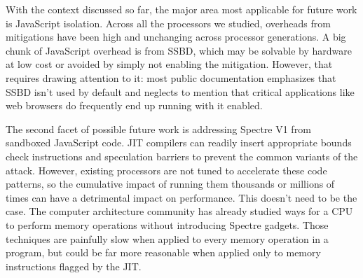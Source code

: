 With the context discussed so far, the major area most applicable for future work is JavaScript isolation.
Across all the processors we studied, overheads from mitigations have been high and unchanging across processor generations.
A big chunk of JavaScript overhead is from SSBD, which may be solvable by hardware at low cost or avoided by simply not enabling the mitigation.
However, that requires drawing attention to it: most public documentation emphasizes that SSBD isn't used by default and neglects to mention that critical applications like web browsers do frequently end up running with it enabled.

The second facet of possible future work is addressing Spectre V1 from sandboxed JavaScript code.
JIT compilers can readily insert appropriate bounds check instructions and speculation barriers to prevent the common variants of the attack.
However, existing processors are not tuned to accelerate these code patterns, so the cumulative impact of running them thousands or millions of times can have a detrimental impact on performance.
This doesn't need to be the case.
The computer architecture community has already studied ways for a CPU to perform memory operations without introducing Spectre gadgets.
Those techniques are painfully slow when applied to every memory operation in a program, but could be far more reasonable when applied only to memory instructions flagged by the JIT.
